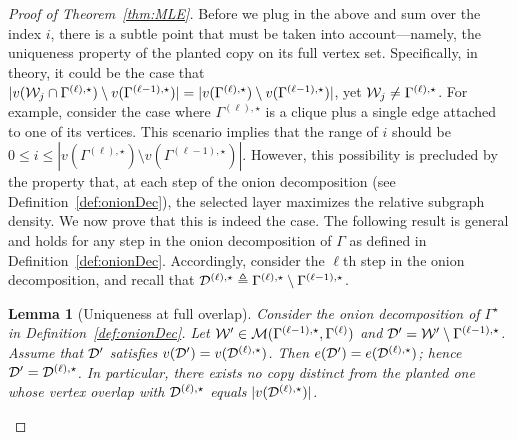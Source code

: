 \documentclass[12pt]{article}
\newtheorem{lemma}{Lemma}
\newcommand{\calD}{{\cal D}}
\newcommand{\calM}{{\cal M}}
\newcommand{\calW}{{\cal W}}
\begin{document}
\begin{proof}[Proof of Theorem~\ref{thm:MLE}]
Before we plug in the above and sum over the index $i$, there is a subtle point that must be taken into account—namely, the uniqueness property of the planted copy on its full vertex set. Specifically, in theory, it could be the case that $|v(\calW_j\cap\Gamma^{(\ell),\star})\setminus v(\Gamma^{(\ell-1),\star})| = |v(\Gamma^{(\ell),\star}) \setminus v(\Gamma^{(\ell-1),\star})|$, yet $\calW_j \neq \Gamma^{(\ell),\star}$. For example, consider the case where $\Gamma^{(\ell),\star}$ is a clique plus a single edge attached to one of its vertices. This scenario implies that the range of $i$ should be $0 \leq i \leq |v(\Gamma^{(\ell),\star}) \setminus v(\Gamma^{(\ell-1),\star})|$. However, this possibility is precluded by the property that, at each step of the onion decomposition (see Definition~\ref{def:onionDec}), the selected layer maximizes the relative subgraph density. We now prove that this is indeed the case. The following result is general and holds for any step in the onion decomposition of $\Gamma$ as defined in Definition~\ref{def:onionDec}. Accordingly, consider the $\ell$th step in the onion decomposition, and recall that $\calD^{(\ell),\star}\triangleq \Gamma^{(\ell),\star} \setminus \Gamma^{(\ell-1),\star}$.
\begin{lemma}[Uniqueness at full overlap]
\label{lem:unique-full-overlap}
Consider the onion decomposition of $\Gamma^\star$ in Definition~\ref{def:onionDec}.
Let $\calW'\in\calM({\Gamma}^{(\ell-1),\star},\Gamma^{(\ell)})$ and $\calD' = \calW'\setminus{\Gamma}^{(\ell-1),\star}$. Assume that $\calD'$ satisfies $v(\calD')=v(\calD^{(\ell),\star})$. Then $e(\calD')=e(\calD^{(\ell),\star})$; hence
$\calD'=\calD^{(\ell),\star}$. In particular, there exists no copy distinct from the planted one whose vertex overlap with $\calD^{(\ell),\star}$ equals $|v(\calD^{(\ell),\star})|$.
\end{lemma}


\end{proof}
\end{document}
